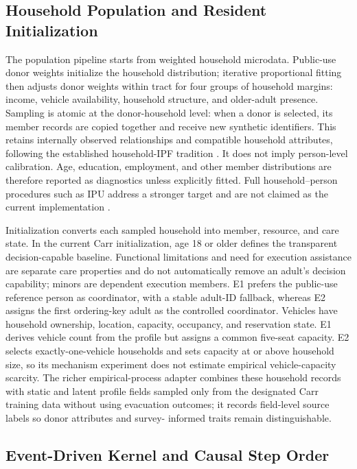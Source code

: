 \documentclass[journal]{IEEEtran}
\begin{document}
\subsection{Household Population and Resident Initialization}

The population pipeline starts from weighted household microdata. Public-use
donor weights initialize the household distribution; iterative proportional
fitting then adjusts donor weights within tract for four groups of household
margins: income, vehicle availability, household structure, and older-adult
presence. Sampling is atomic at the donor-household level: when a donor is
selected, its member records are copied together and receive new synthetic
identifiers. This retains internally observed relationships and compatible
household attributes, following the established household-IPF tradition
\cite{beckman1996synthetic}. It does not imply person-level calibration.
Age, education, employment, and other member distributions are therefore
reported as diagnostics unless explicitly fitted. Full household--person
procedures such as IPU address a stronger target and are not claimed as the
current implementation \cite{ye2009ipu,pritchard2012population,guo2007population}.

Initialization converts each sampled household into member, resource, and care
state. In the current Carr initialization, age 18 or older defines the
transparent decision-capable baseline. Functional limitations and need for
execution assistance are separate care properties and do not automatically
remove an adult's decision capability; minors are dependent execution members.
E1 prefers the public-use reference person as coordinator, with a stable
adult-ID fallback, whereas E2 assigns the first ordering-key adult as the
controlled coordinator. Vehicles have household ownership, location, capacity,
occupancy, and reservation state. E1 derives vehicle count from the profile but
assigns a common five-seat capacity. E2 selects exactly-one-vehicle households
and sets capacity at or above household size, so its mechanism experiment does
not estimate empirical vehicle-capacity scarcity. The richer empirical-process
adapter combines these household records with static and latent profile fields
sampled only from the designated Carr training data without using evacuation
outcomes; it records field-level source labels so donor attributes and survey-
informed traits remain distinguishable.

\subsection{Event-Driven Kernel and Causal Step Order}
\label{sec:dynamic-loop}
\end{document}
